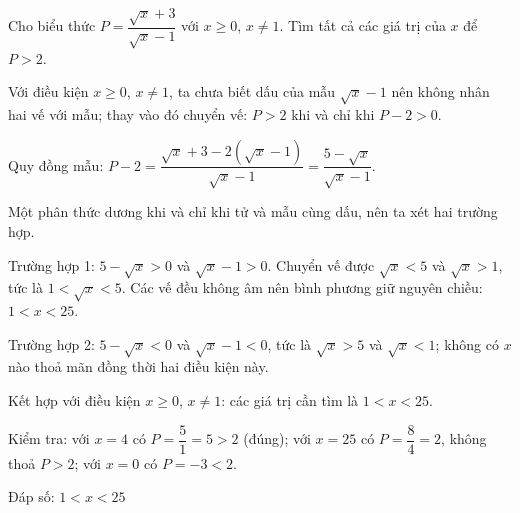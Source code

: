 \begin{problem}[9DS-BPT-018]
Cho biểu thức $P = \dfrac{\sqrt{x} + 3}{\sqrt{x} - 1}$ với $x \geq 0$, $x \neq 1$. Tìm tất cả các giá trị của $x$ để $P > 2$.

\begin{solution}
Với điều kiện $x \geq 0$, $x \neq 1$, ta chưa biết dấu của mẫu $\sqrt{x} - 1$ nên không nhân hai vế với mẫu; thay vào đó chuyển vế: $P > 2$ khi và chỉ khi $P - 2 > 0$.

Quy đồng mẫu: $P - 2 = \dfrac{\sqrt{x} + 3 - 2(\sqrt{x} - 1)}{\sqrt{x} - 1} = \dfrac{5 - \sqrt{x}}{\sqrt{x} - 1}$.

Một phân thức dương khi và chỉ khi tử và mẫu cùng dấu, nên ta xét hai trường hợp.

Trường hợp 1: $5 - \sqrt{x} > 0$ và $\sqrt{x} - 1 > 0$. Chuyển vế được $\sqrt{x} < 5$ và $\sqrt{x} > 1$, tức là $1 < \sqrt{x} < 5$. Các vế đều không âm nên bình phương giữ nguyên chiều: $1 < x < 25$.

Trường hợp 2: $5 - \sqrt{x} < 0$ và $\sqrt{x} - 1 < 0$, tức là $\sqrt{x} > 5$ và $\sqrt{x} < 1$; không có $x$ nào thoả mãn đồng thời hai điều kiện này.

Kết hợp với điều kiện $x \geq 0$, $x \neq 1$: các giá trị cần tìm là $1 < x < 25$.

Kiểm tra: với $x = 4$ có $P = \dfrac{5}{1} = 5 > 2$ (đúng); với $x = 25$ có $P = \dfrac{8}{4} = 2$, không thoả $P > 2$; với $x = 0$ có $P = -3 < 2$.

Đáp số: $\boxed{1 < x < 25}$
\end{solution}
\end{problem}

